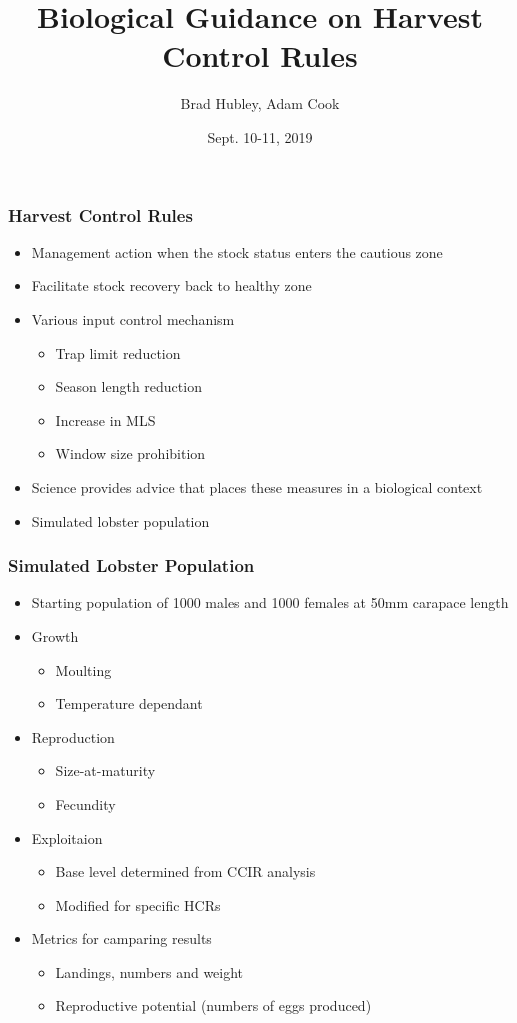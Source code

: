 \documentclass{beamer}
\title[HCR Guidance]{Biological Guidance on Harvest Control Rules}
\author[Hubley and Cook]{Brad Hubley, Adam Cook}
\institute[DFO]{Science Branch, Fisheries and Oceans Canada}
\date{Sept. 10-11, 2019}
\begin{document}
 
\frame{\titlepage}
 

\begin{frame}
\frametitle{Harvest Control Rules}

\begin{itemize}
\item Management action when the stock status enters the cautious zone 
\item Facilitate stock recovery back to healthy zone 
\item Various input control mechanism
\begin{itemize}
\item Trap limit reduction
\item Season length reduction
\item Increase in MLS
\item Window size prohibition
\end{itemize}
\item Science provides advice that places these measures in a biological context 
\item Simulated lobster population
\end{itemize}

\end{frame}


\begin{frame}
\frametitle{Simulated Lobster Population}
    \begin{itemize}
    \item Starting population of 1000 males and 1000 females at 50mm carapace length 
    \item Growth 
    \begin{itemize}
        \item Moulting
        \item Temperature dependant
    \end{itemize}
    \item Reproduction
    \begin{itemize}
        \item Size-at-maturity
        \item Fecundity
    \end{itemize}
    \item Exploitaion
    \begin{itemize}
        \item Base level determined from CCIR analysis
        \item Modified for specific HCRs
    \end{itemize}
    \item Metrics for camparing results
    \begin{itemize}
        \item Landings, numbers and weight
        \item Reproductive potential (numbers of eggs produced)
    \end{itemize}
    \end{itemize}
\end{frame}
\end{document}
